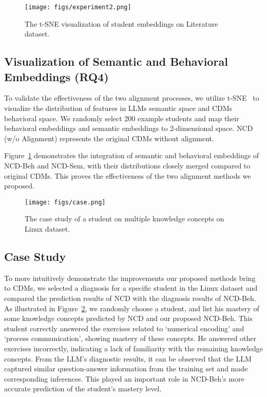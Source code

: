 \begin{figure}[t]
  \centering
  \vspace{-1em}
  \texttt{[image: figs/experiment2.png]}
  \caption{The t-SNE visualization of student embeddings on Literature dataset.}
  \vspace{-2em}
\label{fig: experiment2}
\end{figure}
\subsection{Visualization of Semantic and Behavioral Embeddings (RQ4)}


To validate the effectiveness of the two alignment processes, we utilize t-SNE~\cite{van2008visualizing} to visualize the distribution of features in LLMs semantic space and CDMs behavioral space. We randomly select 200 example students and map their behavioral embeddings and semantic embeddings to 2-dimensional space. NCD (w/o Alignment) represents the original CDMs without alignment.

Figure~\ref{fig: experiment2} demonstrates the integration of semantic and behavioral embeddings of NCD-Beh and NCD-Sem, with their distributions closely merged compared to original CDMs. This proves the effectiveness of the two alignment methods we proposed.

\begin{figure}[t]
  \centering
  
  \texttt{[image: figs/case.png]}
  \caption{The case study of a student on multiple knowledge concepts on Linux dataset.}
  \vspace{-2em}
\label{fig: case}
\end{figure}

\subsection{Case Study}


To more intuitively demonstrate the improvements our proposed methods bring to CDMs, we selected a diagnosis for a specific student in the Linux dataset and compared the prediction results of NCD with the diagnosis results of NCD-Beh.
As illustrated in Figure~\ref{fig: case}, we randomly choose a student, and list his mastery of some knowledge concepts predicted by NCD and our proposed NCD-Beh.
This student correctly answered the exercises related to `numerical encoding' and `process communication', showing mastery of these concepts. He answered other exercises incorrectly, indicating a lack of familiarity with the remaining knowledge concepts.
From the LLM's diagnostic results, it can be observed that the LLM captured similar question-answer information from the training set and made corresponding inferences. This played an important role in NCD-Beh's more accurate prediction of the student's mastery level.